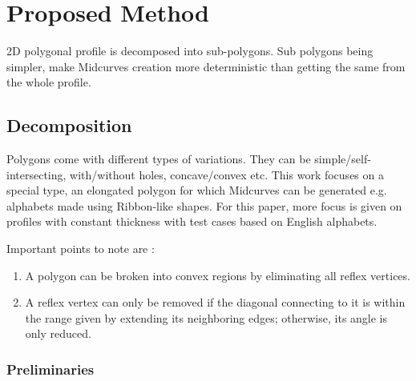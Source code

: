 \section{Proposed Method}	
2D polygonal profile is decomposed  into sub-polygons. Sub polygons being simpler, make Midcurves creation more deterministic than getting the same from the whole profile.

\subsection{Decomposition}
Polygons come with different types of variations. They can be simple/self-intersecting, with/without holes, concave/convex etc. This work focuses on a special type, an elongated polygon for which Midcurves can be generated e.g. alphabets made using Ribbon-like shapes. For this paper, more focus is given on profiles with constant thickness with test cases based on English alphabets. 

Important points to note are \cite{Bayazit}:
\begin{enumerate}
\item A polygon can be broken into convex regions by eliminating all reflex vertices.
\item A reflex vertex can only be removed if the diagonal connecting to it is within the range given by extending its neighboring edges; otherwise, its angle is only reduced.
\end{enumerate}

\subsubsection{Preliminaries}

